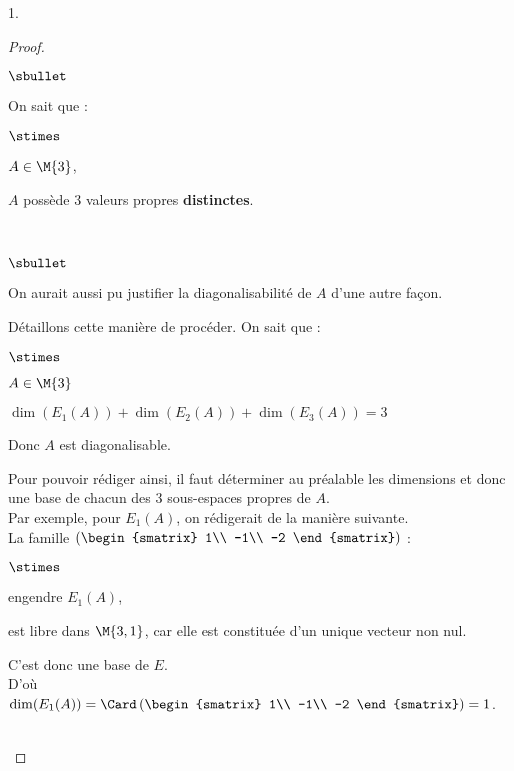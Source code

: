 \documentclass[11pt]{article}%
\begin{document}
\begin{noliste}{1.}
\begin{proof}
\begin{noliste}{$\sbullet$}
 \item On sait que :
  \begin{noliste}{$\stimes$}
    \item $A\in \M{3}$,
    \item $A$ possède $3$ valeurs propres {\bf distinctes}.
  \end{noliste}
  ~\\[-1cm]
 \end{noliste}
  \begin{remark}
    \begin{noliste}{$\sbullet$}
    \item On aurait aussi pu justifier la diagonalisabilité de $A$
      d'une autre façon.
    \item Détaillons cette manière de procéder. On sait que :
      \begin{noliste}{$\stimes$}
      \item $A\in\M{3}$
      \item $\dim(E_1(A))+\dim(E_2(A))+\dim(E_3(A))=3$
      \end{noliste}
      Donc $A$ est diagonalisable.
    \item Pour pouvoir rédiger ainsi, il faut déterminer au préalable
      les dimensions et donc une base de chacun des $3$ sous-espaces
      propres de $A$.\\
      Par exemple, pour $E_1(A)$, on rédigerait de la manière
      suivante.\\
      La famille $\left(
        \begin{smatrix}
          1\\
          -1\\
          -2
        \end{smatrix}\right)$ :
      \begin{noliste}{$\stimes$}
      \item engendre $E_1(A)$,
      \item est libre dans $\M{3,1}$, car elle est constituée d'un
        unique vecteur non nul.
      \end{noliste}
      C'est donc une base de $E$.\\
      D'où $\dim(E_1(A))=\Card\left(
        \begin{smatrix}
          1\\
          -1\\
          -2
        \end{smatrix}
      \right)=1$.
    \end{noliste}
  \end{remark}~\\[-1.4cm]
 \end{proof}
 

\end{noliste}
\end{document}
